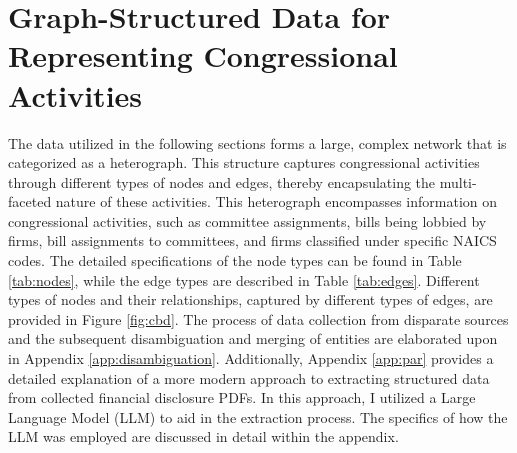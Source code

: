 \documentclass[15pt,letterpaper]{article}
\begin{document}


\section{Graph-Structured Data for Representing Congressional Activities\protect\footnotemark}\label{sec:data} 
The data utilized in the following sections forms a large, complex network that is categorized as a heterograph. This structure captures congressional activities through different types of nodes and edges, thereby encapsulating the multi-faceted nature of these activities. 
This heterograph encompasses information on congressional activities, such as committee assignments, bills being lobbied by firms, bill assignments to committees, and firms classified under specific NAICS codes. The detailed specifications of the node types can be found in Table \ref{tab:nodes}, while the edge types are described in Table \ref{tab:edges}.
Different types of nodes and their relationships, captured by different types of edges, are provided in Figure \ref{fig:cbd}.
The process of data collection from disparate sources and the subsequent disambiguation and merging of entities are elaborated upon in Appendix \ref{app:disambiguation}.
Additionally, Appendix \ref{app:par} provides a detailed explanation of a more modern approach to extracting structured data from collected financial disclosure PDFs. In this approach, I utilized a Large Language Model (LLM) to aid in the extraction process. The specifics of how the LLM was employed are discussed in detail within the appendix.
\end{document}
